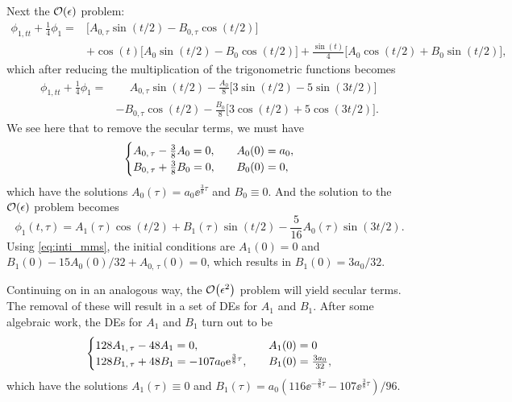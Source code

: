 Next the $\order{\epsilon}$ problem: 
\begin{equation}
\begin{aligned}
\phi_{1, tt}+\frac{1}{4}\phi_1=&\Big[A_{0,\tau}\sin(t/2)-B_{0, \tau}\cos(t/2)\Big]\\
&+\cos(t)\Big[A_0\sin(t/2)-B_0\cos(t/2)\Big]
+\frac{\sin(t)}{4}\Big[A_0\cos(t/2)+B_0\sin(t/2)\Big],
\end{aligned}
\end{equation}
which after reducing the multiplication of the trigonometric functions
becomes
\begin{equation}
\begin{aligned}
\phi_{1, tt}+\frac{1}{4}\phi_1=&\phantom{+}A_{0,\tau}\sin(t/2)
-\frac{A_0}{8}\Big[3\sin(t/2)-5\sin(3t/2)\Big]\\
&{-}B_{0, \tau}\cos(t/2)
-\frac{B_0}{8}\Big[3\cos(t/2)+5\cos(3t/2)\Big].
\end{aligned}
\end{equation}
We see here that to remove the secular terms, we must have
\begin{equation}
\begin{cases}
A_{0,\,\tau}-\frac{3}{8}A_0=0\qcomma&A_0(0)=a_0,\\
B_{0,\,\tau}+\frac{3}{8}B_0=0\qcomma&B_0(0)=0,
\end{cases}
\end{equation}
which have the solutions $A_0(\tau)=a_0\ee^{\frac{3}{8}\tau}$ and
$B_0\equiv0$. And the solution to the $\order{\epsilon}$ problem
becomes
\begin{equation}
\phi_1(t, \tau)=A_1(\tau)\cos(t/2)+B_1(\tau)\sin(t/2)
-\frac{5}{16}A_0(\tau)\sin(3t/2).
\end{equation}
Using \eqref{eq:inti_mms}, the initial conditions are $A_1(0)=0$ and
$B_1(0)-15A_0(0)/32 + A_{0,\,\tau}(0)=0$, which results in $B_1(0)=3a_0/32$.

Continuing on in an analogous way, the $\order{\epsilon^2}$ problem
will yield secular terms. The removal of these will result in a set of
DEs for $A_1$ and $B_1$. 
After some algebraic work, the DEs for $A_1$ and $B_1$ turn out to be
\begin{equation}
\begin{cases}
128A_{1,\,\tau}-48A_1=0\qcomma&A_1(0)=0\\
128B_{1,\,\tau}+48B_1=-107a_0\ee^{\frac{3}{8}\tau}\qcomma&B_1(0)=\frac{3a_0}{32},
\end{cases}
\end{equation}
which have the solutions $A_1(\tau)\equiv0$ and
$B_1(\tau)=a_0(116\ee^{-\frac{3}{8}\tau}-107\ee^{\frac{3}{8}\tau})/96$.


